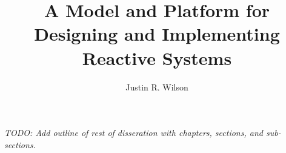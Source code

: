 \documentclass[letterpaper]{book}
\title{A Model and Platform for Designing and Implementing Reactive Systems}
\author{Justin R. Wilson}
\date{}
\begin{document}
\maketitle

















\emph{TODO: Add outline of rest of disseration with chapters, sections, and sub-sections.}



{}
\end{document}

